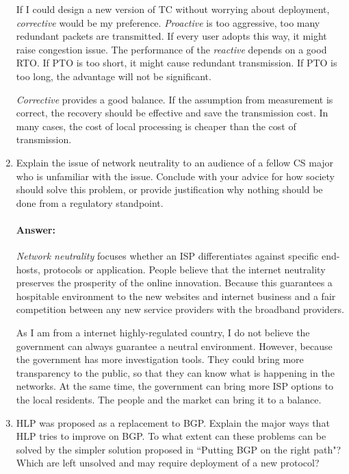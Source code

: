 \documentclass[a4paper,11pt]{article}
\theoremstyle{mytheor}
\begin{document}
\begin{enumerate}
If I could design a new version of TC without worrying about deployment, 
\emph{corrective} would be my preference.
\emph{Proactive} is too aggressive, too many redundant packets are transmitted.
If every user adopts this way, it might raise congestion issue.
The performance of the \emph{reactive} depends on a good RTO.
If PTO is too short, it might cause redundant transmission.
If PTO is too long, the advantage will not be significant.

\emph{Corrective} provides a good balance.
If the assumption from measurement is correct, the recovery should be effective and save the transmission cost.
In many cases, the cost of local processing is cheaper than the cost of transmission.


\item
Explain the issue of network neutrality to an audience of a fellow CS major who is unfamiliar with the issue.
Conclude with your advice for how society should solve this problem, or provide justification why nothing should be done from a regulatory standpoint.
\paragraph{Answer:}
\emph{Network neutrality} focuses whether an ISP differentiates against specific end-hosts, protocols or application.
People believe that the internet neutrality preserves the prosperity of the online innovation.
Because this guarantees a hospitable environment to the new websites and internet business and a fair competition between any new service providers with the broadband providers.

As I am from a internet highly-regulated country, I do not believe the government can always guarantee a neutral environment.
However, because the government has more investigation tools. 
They could bring more transparency to the public, so that they can know what is happening in the networks.
At the same time, the government can bring more ISP options to the local residents.
The people and the market can bring it to a balance.

\item
HLP was proposed as a replacement to BGP. 
Explain the major ways that HLP tries to improve on BGP. 
To what extent can these problems can be solved by the simpler solution proposed in ``Putting BGP on the
right path"? 
Which are left unsolved and may require deployment of a new protocol?

\end{enumerate}
\end{document}
